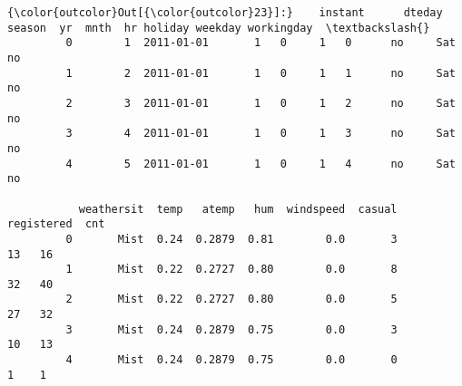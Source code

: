 \documentclass[11pt]{article}
\begin{document}
\begin{Verbatim}[commandchars=\\\{\}]
{\color{outcolor}Out[{\color{outcolor}23}]:}    instant      dteday  season  yr  mnth  hr holiday weekday workingday  \textbackslash{}
         0        1  2011-01-01       1   0     1   0      no     Sat         no   
         1        2  2011-01-01       1   0     1   1      no     Sat         no   
         2        3  2011-01-01       1   0     1   2      no     Sat         no   
         3        4  2011-01-01       1   0     1   3      no     Sat         no   
         4        5  2011-01-01       1   0     1   4      no     Sat         no   
         
           weathersit  temp   atemp   hum  windspeed  casual  registered  cnt  
         0       Mist  0.24  0.2879  0.81        0.0       3          13   16  
         1       Mist  0.22  0.2727  0.80        0.0       8          32   40  
         2       Mist  0.22  0.2727  0.80        0.0       5          27   32  
         3       Mist  0.24  0.2879  0.75        0.0       3          10   13  
         4       Mist  0.24  0.2879  0.75        0.0       0           1    1  
\end{Verbatim}
            
\end{document}

